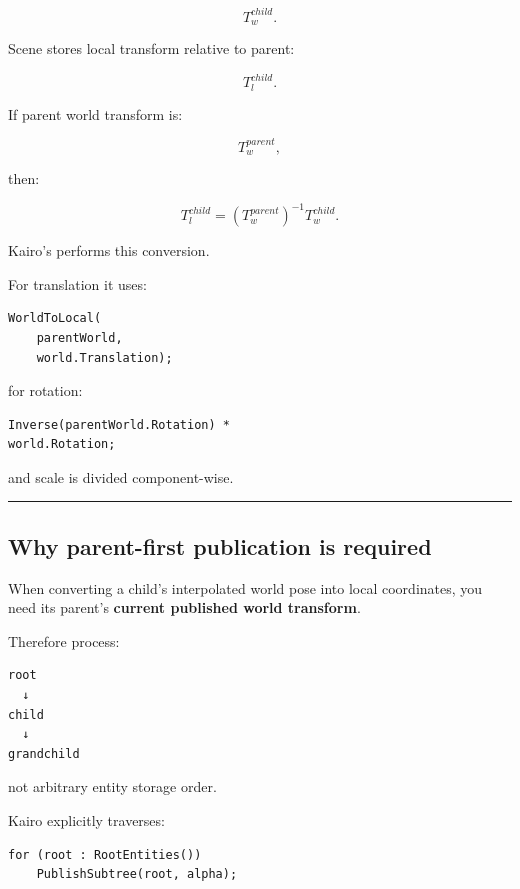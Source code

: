 \[
T_w^{child}.
\]

Scene stores local transform relative to parent:

\[
T_l^{child}.
\]

If parent world transform is:

\[
T_w^{parent},
\]

then:

\[
\boxed{
T_l^{child}
=
(T_w^{parent})^{-1}
T_w^{child}.
}
\]

Kairo's  performs this conversion.

For translation it uses:

\begin{verbatim}
WorldToLocal(
    parentWorld,
    world.Translation);
\end{verbatim}

for rotation:

\begin{verbatim}
Inverse(parentWorld.Rotation) *
world.Rotation;
\end{verbatim}

and scale is divided component-wise.

\begin{center}\rule{0.5\linewidth}{0.5pt}\end{center}

\subsection{Why parent-first publication is required}\label{06-engine-ii-ch037-why-parent-first-publication-is-required}

\hypertarget{06-engine-ii-ch037-why-parent-first-publication-is-required}{}

When converting a child's interpolated world pose into local coordinates, you need its parent's \textbf{current published world transform}.

Therefore process:

\begin{verbatim}
root
  ↓
child
  ↓
grandchild
\end{verbatim}

not arbitrary entity storage order.

Kairo explicitly traverses:

\begin{verbatim}
for (root : RootEntities())
    PublishSubtree(root, alpha);
\end{verbatim}

